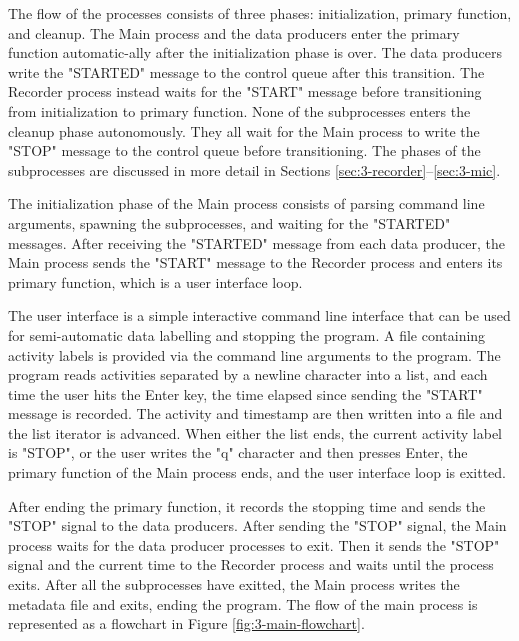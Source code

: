 The flow of the processes consists of three phases: initialization, primary function, and cleanup.
The Main process and the data producers enter the primary function automatic-ally after the initialization phase is over.
The data producers write the "STARTED" message to the control queue after this transition.
The Recorder process instead waits for the "START" message before transitioning from initialization to primary function.
None of the subprocesses enters the cleanup phase autonomously.
They all wait for the Main process to write the "STOP" message to the control queue before transitioning.
The phases of the subprocesses are discussed in more detail in Sections \ref{sec:3-recorder}--\ref{sec:3-mic}.

The initialization phase of the Main process consists of parsing command line arguments,
spawning the subprocesses, and waiting for the "STARTED" messages.
After receiving the "STARTED" message from each data producer,
the Main process sends the "START" message to the Recorder process and enters its primary function, which is a user interface loop.

The user interface is a simple interactive command line interface that can be used for semi-automatic data labelling and stopping the program.
A file containing activity labels is provided via the command line arguments to the program.
The program reads activities separated by a newline character into a list,
and each time the user hits the Enter key,
the time elapsed since sending the "START" message is recorded.
The activity and timestamp are then written into a file and the list iterator is advanced.
When either the list ends, the current activity label is "STOP", or the user writes the "q" character and then presses Enter,
the primary function of the Main process ends, and the user interface loop is exitted.

After ending the primary function,
it records the stopping time and sends the "STOP" signal to the data producers.
After sending the "STOP" signal, the Main process waits for the data producer processes to exit.
Then it sends the "STOP" signal and the current time to the Recorder process and waits until the process exits.
After all the subprocesses have exitted, the Main process writes the metadata file and exits,
ending the program.
The flow of the main process is represented as a flowchart in Figure \ref{fig:3-main-flowchart}.

